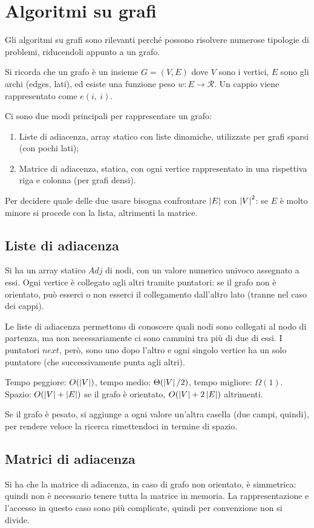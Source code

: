 \newpage
\section{Algoritmi su grafi}
Gli algoritmi su grafi sono rilevanti perché possono risolvere numerose tipologie di problemi, riducendoli appunto a un grafo.

Si ricorda che un grafo è un insieme $G = (V, E)$ dove $V$ sono i vertici, $E$ sono gli archi (edges, lati), ed esiste una funzione peso $w : E \rightarrow \mathcal{R}$. Un cappio viene rappresentato come $e(i,\ i)$. 

Ci sono due modi principali per rappresentare un grafo: 
\begin{enumerate}
	\item Liste di adiacenza, array statico con liste dinamiche, utilizzate per grafi sparsi (con pochi lati);
	\item Matrice di adiacenza, statica, con ogni vertice rappresentato in una rispettiva riga e colonna (per grafi densi).
\end{enumerate}
Per decidere quale delle due usare bisogna confrontare $\left|E\right|$ con $\left|V\right|^2$: se $E$ è molto minore si procede con la lista, altrimenti la matrice.

\subsection{Liste di adiacenza}
Si ha un array statico $Adj$ di nodi, con un valore numerico univoco assegnato a essi. Ogni vertice è collegato agli altri tramite puntatori: se il grafo non è orientato, può esserci o non esserci il collegamento dall'altro lato (tranne nel caso dei cappi).

Le liste di adiacenza permettono di conoscere quali nodi sono collegati al nodo di partenza, ma non necessariamente ci sono cammini tra più di due di essi. I puntatori $next$, però, sono uno dopo l'altro e ogni singolo vertice ha un solo puntatore (che successivamente punta agli altri).

Tempo peggiore: $O(\left|V\right|)$, tempo medio: $\Theta(\left|V\right|/2)$, tempo migliore: $\Omega(1)$. \\
Spazio: $O(\left|V\right| + \left|E\right|)$ se il grafo è orientato, $O(\left|V\right| + 2\left|E\right|)$ altrimenti.

Se il grafo è pesato, si aggiunge a ogni valore un'altra casella (due campi, quindi), per rendere veloce la ricerca rimettendoci in termine di spazio. 

\subsection{Matrici di adiacenza}
Si ha che la matrice di adiacenza, in caso di grafo non orientato, è simmetrica: quindi non è necessario tenere tutta la matrice in memoria. La rappresentazione e l'accesso in questo caso sono più complicate, quindi per convenzione non si divide.

